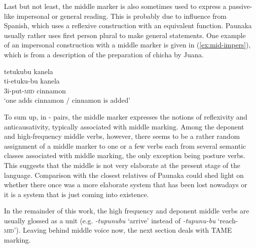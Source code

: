 Last but not least, the middle marker is also sometimes used to express a passive-like impersonal or general reading. This is probably due to influence from Spanish, which uses a reflexive construction with an equivalent function. Paunaka usually rather uses first person plural to make general statements. One example of an impersonal construction with a middle marker is given in (\ref{ex:mid-impers}), which is from a description of the preparation of chicha by Juana.

\ea\label{ex:mid-impers}
\begingl 
\glpreamble tetukubu kanela\\
\gla ti-etuku-bu kanela\\ 
\glb 3i-put-\textsc{mid} cinnamon\\ 
\glft ‘one adds cinnamon / cinnamon is added’\\ 
\endgl
 \trailingcitation{[jxx-e110923l-2.121]}
\xe

To sum up, in - pairs, the middle marker expresses the notions of reflexivity and anticausativity, typically associated with middle marking. Among the deponent and high-frequency middle verbs, however, there seems to be a rather random assignment of a middle marker to one or a few verbs each from several semantic classes associated with middle marking, the only exception being posture verbs. This suggests that the middle is not very elaborate at the present stage of the language. Comparison with the closest relatives of Paunaka could shed light on whether there once was a more elaborate system that has been lost nowadays or it is a system that is just coming into existence.

In the remainder of this work, the high frequency and deponent middle verbs are usually glossed as a unit (e.g. \textit{-tupunubu} ‘arrive’ instead of \textit{-tupunu-bu} ‘reach-\textsc{mid}’). Leaving behind middle voice now, the next section deals with TAME marking.